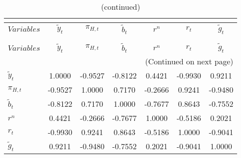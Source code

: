  
\begin{center}
\begin{longtable}{lcccccc} 
\caption{MATRIX OF CORRELATIONS}\\
 \label{Table:th_corr_matrix}\\
\toprule 
$Variables        $	 & 	 $   {\tilde{y}_{t}}$	 & 	 $       {\pi_{H,t}}$	 & 	 $     \tilde{b}_{t}$	 & 	 $            {r^{n}}$	 & 	 $            {r_{t}}$	 & 	 $     \tilde{g}_{t}$\\
\midrule \endfirsthead 
\caption{(continued)}\\
 \toprule \\ 
$Variables        $	 & 	 $   {\tilde{y}_{t}}$	 & 	 $       {\pi_{H,t}}$	 & 	 $     \tilde{b}_{t}$	 & 	 $            {r^{n}}$	 & 	 $            {r_{t}}$	 & 	 $     \tilde{g}_{t}$\\
\midrule \endhead 
\midrule \multicolumn{7}{r}{(Continued on next page)} \\ \bottomrule \endfoot 
\bottomrule \endlastfoot 
${\tilde{y}_{t}}  $	 & 	             1.0000	 & 	            -0.9527	 & 	            -0.8122	 & 	             0.4421	 & 	            -0.9930	 & 	             0.9211 \\ 
${\pi_{H,t}}      $	 & 	            -0.9527	 & 	             1.0000	 & 	             0.7170	 & 	            -0.2666	 & 	             0.9241	 & 	            -0.9480 \\ 
$\tilde{b}_{t}    $	 & 	            -0.8122	 & 	             0.7170	 & 	             1.0000	 & 	            -0.7677	 & 	             0.8643	 & 	            -0.7552 \\ 
${r^{n}}          $	 & 	             0.4421	 & 	            -0.2666	 & 	            -0.7677	 & 	             1.0000	 & 	            -0.5186	 & 	             0.2021 \\ 
${r_{t}}          $	 & 	            -0.9930	 & 	             0.9241	 & 	             0.8643	 & 	            -0.5186	 & 	             1.0000	 & 	            -0.9041 \\ 
$\tilde{g}_{t}    $	 & 	             0.9211	 & 	            -0.9480	 & 	            -0.7552	 & 	             0.2021	 & 	            -0.9041	 & 	             1.0000 \\ 
\end{longtable}
 \end{center}
